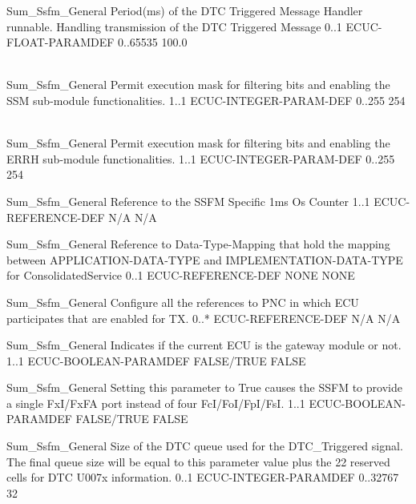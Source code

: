 {Sum_Ssfm_General}
{Period(ms) of the DTC Triggered Message Handler runnable. Handling transmission of the DTC Triggered Message}
{0..1}
{ECUC-FLOAT-PARAMDEF}
{0..65535}
{100.0}

\\
{Sum_Ssfm_General}
{Permit execution mask for filtering bits and enabling the SSM sub-module functionalities.}
{1..1}
{ECUC-INTEGER-PARAM-DEF}
{0..255}
{254}
{  }

\\
{Sum_Ssfm_General}
{Permit execution mask for filtering bits and enabling the ERRH sub-module functionalities.}
{1..1}
{ECUC-INTEGER-PARAM-DEF}
{0..255}
{254}
{  }

{Sum_Ssfm_General}
{Reference to the SSFM Specific 1ms Os Counter}
{1..1}
{ECUC-REFERENCE-DEF}
{N/A}
{N/A}

{Sum_Ssfm_General}
{Reference to Data-Type-Mapping that hold the mapping between APPLICATION-DATA-TYPE and IMPLEMENTATION-DATA-TYPE for ConsolidatedService}
{0..1}
{ECUC-REFERENCE-DEF}
{NONE}
{NONE}

{Sum_Ssfm_General}
{Configure all the references to PNC in which ECU participates that are enabled for TX.}
{0..*}
{ECUC-REFERENCE-DEF}
{N/A}
{N/A}

{Sum_Ssfm_General}
{Indicates if the current ECU is the gateway module or not.}
{1..1}
{ECUC-BOOLEAN-PARAMDEF}
{FALSE/TRUE}
{FALSE}

{Sum_Ssfm_General}
{Setting this parameter to True causes the SSFM to provide a single FxI/FxFA port instead of four FcI/FoI/FpI/FsI.}
{1..1}
{ECUC-BOOLEAN-PARAMDEF}
{FALSE/TRUE}
{FALSE}

{Sum_Ssfm_General}
{Size of the DTC queue used for the DTC_Triggered signal. The final queue size will be equal to this parameter value plus the 22 reserved cells for DTC U007x information.}
{0..1}
{ECUC-INTEGER-PARAMDEF}
{0..32767}
{32}

